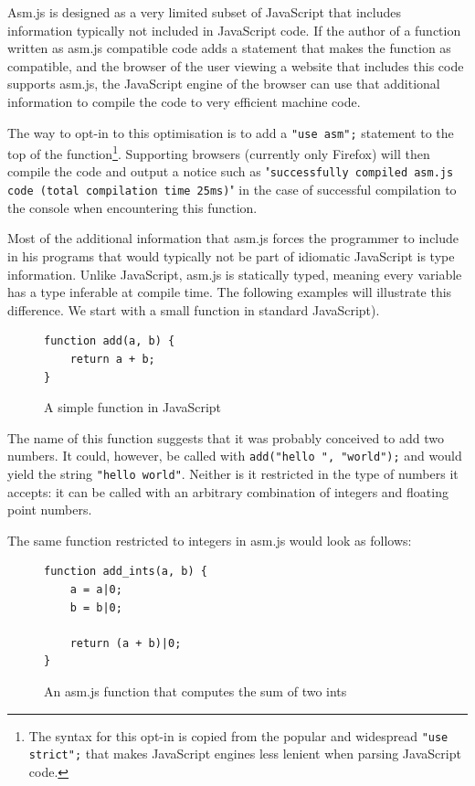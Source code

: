 \documentclass[11pt]{report}
\begin{document}
Asm.js is designed as a very limited subset of JavaScript that includes information typically not included in JavaScript code. If the author of a function written as asm.js compatible code adds a statement that makes the function as compatible, and the browser of the user viewing a website that includes this code supports asm.js, the JavaScript engine of the browser can use that additional information to compile the code to very efficient machine code.

The way to opt-in to this optimisation is to add a \texttt{"use asm";} statement to the top of the function\footnote{The syntax for this opt-in is copied from the popular and widespread \texttt{"use strict";} that makes JavaScript engines less lenient when parsing JavaScript code.}. Supporting browsers (currently only Firefox) will then compile the code and output a notice such as "\texttt{successfully compiled asm.js code (total compilation time 25ms)}" in the case of successful compilation to the console when encountering this function.

Most of the additional information that asm.js forces the programmer to include in his programs that would typically not be part of idiomatic JavaScript is type information. Unlike JavaScript, asm.js is statically typed, meaning every variable has a type inferable at compile time. The following examples will illustrate this difference. We start with a small function in standard JavaScript).

\begin{figure}[ht]
\begin{lstlisting}
function add(a, b) {
    return a + b;
}
\end{lstlisting}
\caption{A simple function in JavaScript}
\label{jssimplefunc}
\end{figure}

The name of this function suggests that it was probably conceived to add two numbers. It could, however, be called with \texttt{add("hello ", "world");} and would yield the string \texttt{"hello world"}. Neither is it restricted in the type of numbers it accepts: it can be called with an arbitrary combination of integers and floating point numbers.

The same function restricted to integers in asm.js would look as follows:

\begin{figure}[ht]
\begin{lstlisting}
function add_ints(a, b) {
    a = a|0;
    b = b|0;
    
    return (a + b)|0;
}
\end{lstlisting}
\caption{An asm.js function that computes the sum of two ints}
\label{asmjsadder}
\end{figure}
\end{document}
